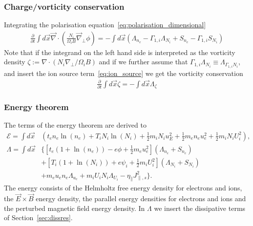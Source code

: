 \subsubsection{Charge/vorticity conservation}
Integrating the polarisation equation~\eqref{eq:polarisation_dimensional}
\begin{align}
  \frac{\partial}{\partial t} \int d\vec{x} \vec{\nabla} \cdot\left(\frac{N_i}{\Omega_i B} \vec{\nabla}_\perp \phi\right) =  - \int d\vec{x} (\Lambda_{n_e} - \Gamma_{1,i}\Lambda_{N_i} + S_{n_e} - \Gamma_{1,i}S_{N_i})
\end{align}
Note that if the integrand on the left hand side is interpreted as the \ExB vorticity
density
$\zeta := \nabla\cdot( N_i\nabla_\perp/\Omega_i B)$
and if we further assume that $\Gamma_{1,i} \Lambda_{N_i} \equiv \Lambda_{\Gamma_{1,i}N_i}$, and insert the ion source term~\eqref{eq:ion_source}
we get the vorticity conservation
\begin{align}
  \frac{\partial}{\partial t} \int d\vec{x} \zeta =  - \int d\vec{x}\Lambda_{\zeta}
  \label{}
\end{align}

\subsubsection{Energy theorem}
The terms of the energy theorem are derived to
\begin{align}
  \mathcal{E}= \int  d\vec{x} & \left( t_e n_e \ln{(n_e)} +T_i N_i\ln{(N_i)}+  \frac{1}{2} m_i N_i u_E^2 +\frac{1}{2} m_e  n_e u_e^2 +\frac{1}{2} m_i  N_i U_i^2  \right),\\
  \Lambda =  \int d\vec{x} & \bigg\{  \left[t_e\left( 1+\ln{(n_e)}\right) -e \phi + \frac{1}{2} m_e u_e^2 \right](\Lambda_{n_e} + S_{n_e})
  \nonumber\\ &
+\left[T_i\left( 1+\ln{(N_i)}\right) +e \psi_i + \frac{1}{2} m_i U_i^2 \right](\Lambda_{N_i}+S_{N_i})
\nonumber \\ &
+ m_e u_e n_e \Lambda_{u_e}+m_iU_i N_i \Lambda_{U_i} - \eta_\parallel J_{\parallel,s}^2\bigg\}.
\end{align}
The energy consists of the Helmholtz free energy density for electrons and ions, the \(\vec{E} \times \vec{B}\) energy density, the parallel energy densities for electrons and ions and the perturbed magnetic field energy density.
In \(\Lambda\) we insert the dissipative terms of Section~\ref{sec:dissres}. \\
